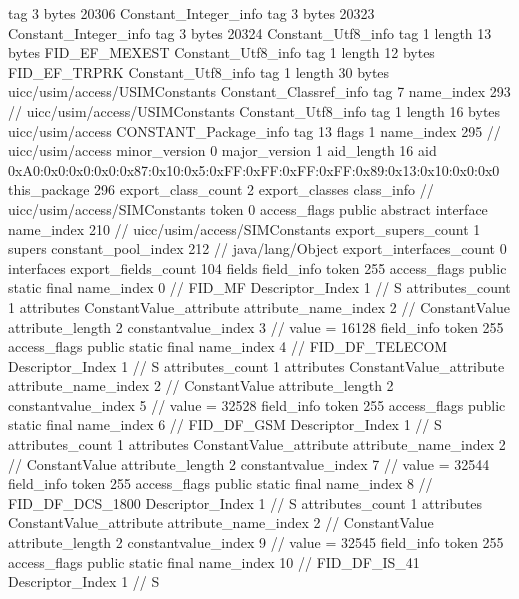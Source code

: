 {{{			tag	3
			bytes	20306
		}
		Constant_Integer_info {
			tag	3
			bytes	20323
		}
		Constant_Integer_info {
			tag	3
			bytes	20324
		}
		Constant_Utf8_info {
			tag	1
			length	13
			bytes	FID_EF_MEXEST
		}
		Constant_Utf8_info {
			tag	1
			length	12
			bytes	FID_EF_TRPRK
		}
		Constant_Utf8_info {
			tag	1
			length	30
			bytes	uicc/usim/access/USIMConstants
		}
		Constant_Classref_info {
			tag	7
			name_index	293		// uicc/usim/access/USIMConstants
		}
		Constant_Utf8_info {
			tag	1
			length	16
			bytes	uicc/usim/access
		}
		CONSTANT_Package_info {
			tag	13
			flags	1
			name_index	295		// uicc/usim/access
			minor_version	0
			major_version	1
			aid_length	16
			aid	0xA0:0x0:0x0:0x0:0x87:0x10:0x5:0xFF:0xFF:0xFF:0xFF:0x89:0x13:0x10:0x0:0x0
		}
	}
	this_package	296
	export_class_count	2
	export_classes {
		class_info {		// uicc/usim/access/SIMConstants
			token	0
			access_flags	public abstract interface
			name_index	210		// uicc/usim/access/SIMConstants
			export_supers_count	1
			supers {
				constant_pool_index	212		// java/lang/Object
			}
			export_interfaces_count	0
			interfaces {
			}
			export_fields_count	104
			fields {
			field_info {
				token	255
				access_flags	public static final
				name_index	0		// FID_MF
				Descriptor_Index	1		// S
				attributes_count	1
				attributes {
				ConstantValue_attribute {
					attribute_name_index	2		// ConstantValue
					attribute_length	2
					constantvalue_index	3		// value = 16128
				}
				}
			}
			field_info {
				token	255
				access_flags	public static final
				name_index	4		// FID_DF_TELECOM
				Descriptor_Index	1		// S
				attributes_count	1
				attributes {
				ConstantValue_attribute {
					attribute_name_index	2		// ConstantValue
					attribute_length	2
					constantvalue_index	5		// value = 32528
				}
				}
			}
			field_info {
				token	255
				access_flags	public static final
				name_index	6		// FID_DF_GSM
				Descriptor_Index	1		// S
				attributes_count	1
				attributes {
				ConstantValue_attribute {
					attribute_name_index	2		// ConstantValue
					attribute_length	2
					constantvalue_index	7		// value = 32544
				}
				}
			}
			field_info {
				token	255
				access_flags	public static final
				name_index	8		// FID_DF_DCS_1800
				Descriptor_Index	1		// S
				attributes_count	1
				attributes {
				ConstantValue_attribute {
					attribute_name_index	2		// ConstantValue
					attribute_length	2
					constantvalue_index	9		// value = 32545
				}
				}
			}
			field_info {
				token	255
				access_flags	public static final
				name_index	10		// FID_DF_IS_41
				Descriptor_Index	1		// S
}}}}}
